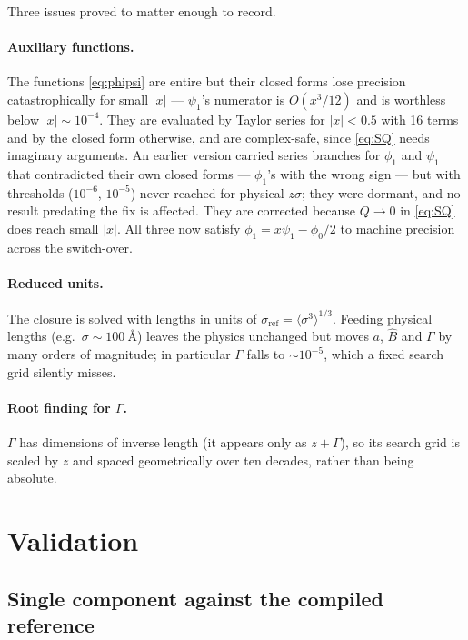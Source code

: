 \documentclass[11pt,a4paper]{article}
\begin{document}
Three issues proved to matter enough to record.

\paragraph{Auxiliary functions.} The functions \eqref{eq:phipsi} are entire but
their closed forms lose precision catastrophically for small $|x|$ ---
$\psi_1$'s numerator is $O(x^3/12)$ and is worthless below $|x|\sim10^{-4}$.
They are evaluated by Taylor series for $|x|<0.5$ with 16 terms and by the
closed form otherwise, and are complex-safe, since \eqref{eq:SQ} needs
imaginary arguments. An earlier version carried series branches for $\phi_1$
and $\psi_1$ that contradicted their own closed forms --- $\phi_1$'s with the
wrong sign --- but with thresholds ($10^{-6}$, $10^{-5}$) never reached for
physical $z\sigma$; they were dormant, and no result predating the fix is
affected. They are corrected because $Q\to0$ in \eqref{eq:SQ} does reach small
$|x|$. All three now satisfy $\phi_1=x\psi_1-\phi_0/2$ to machine precision
across the switch-over.

\paragraph{Reduced units.} The closure is solved with lengths in units of
$\sigma_{\mathrm{ref}}=\langle\sigma^3\rangle^{1/3}$. Feeding physical lengths
(e.g.\ $\sigma\sim\SI{100}{\angstrom}$) leaves the physics unchanged but moves
$a$, $\hat B$ and $\Gamma$ by many orders of magnitude; in particular $\Gamma$
falls to $\sim10^{-5}$, which a fixed search grid silently misses.

\paragraph{Root finding for $\Gamma$.} $\Gamma$ has dimensions of inverse
length (it appears only as $z+\Gamma$), so its search grid is scaled by $z$
and spaced geometrically over ten decades, rather than being absolute.

\section{Validation}
\label{sec:valid}

\subsection{Single component against the compiled reference}
\label{sec:clib}
\end{document}
